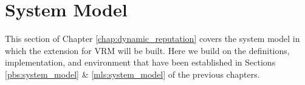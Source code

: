 \section{System Model}
\label{rep:system_model}

This section of Chapter \ref{chap:dynamic_reputation} covers the system model in which the extension for VRM will be built. Here we build on the definitions, implementation, and environment that have been established in Sections \ref{pbs:system_model} \& \ref{mls:system_model} of the previous chapters.


% 

% 